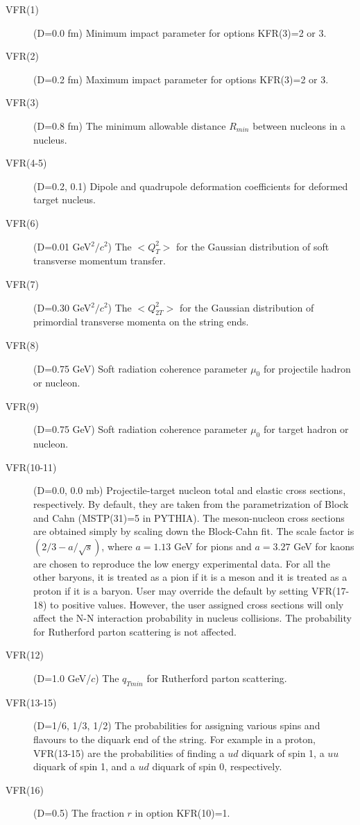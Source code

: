 \begin{itemize}
\begin{description}
\item[VFR(1)] (D=0.0 fm)
       Minimum impact parameter for options KFR(3)=2 or 3.
\item[VFR(2)] (D=0.2 fm)
       Maximum impact parameter for options KFR(3)=2 or 3.
\item[VFR(3)] (D=0.8 fm)
       The minimum allowable distance $R_{min}$ between nucleons in a nucleus.  
\item[VFR(4-5)] (D=0.2, 0.1)
       Dipole and quadrupole deformation coefficients for deformed target
       nucleus.
\item[VFR(6)] (D=0.01 GeV$^2/c^2$)
       The $<Q_T^2>$ for the Gaussian distribution of soft transverse 
       momentum transfer.
\item[VFR(7)] (D=0.30 GeV$^2/c^2$)
       The $<Q^2_{2T}>$ for the Gaussian distribution of primordial transverse
       momenta on the string ends.       
\item[VFR(8)] (D=0.75 GeV)
       Soft radiation coherence parameter $\mu_0$ for projectile hadron or
       nucleon. 
\item[VFR(9)] (D=0.75 GeV)
       Soft radiation coherence parameter $\mu_0$ for target hadron or nucleon. 
\item[VFR(10-11)] (D=0.0, 0.0 mb)
       Projectile-target nucleon total and elastic cross 
       sections, respectively.
       By default, they are taken from the parametrization 
       of Block and Cahn \cite{block} (MSTP(31)=5 in PYTHIA).  
       The meson-nucleon cross sections are obtained
       simply by scaling down the Block-Cahn fit. The scale factor is
       $(2/3-a/\sqrt s)$, where $a=1.13$ GeV for pions and $a=3.27$ GeV for kaons
       are chosen to reproduce the low energy experimental data. For
       all the other baryons, it is treated as a pion if it is a meson
       and it is treated as a proton if it is a baryon.
       User may override the default by setting VFR(17-18) to positive values.
       However, the user assigned cross sections will only affect the
       N-N interaction probability in nucleus collisions. The
       probability for Rutherford parton scattering is not affected.  
\item[VFR(12)] (D=1.0 GeV/$c$)
       The $q_{Tmin}$ for Rutherford parton scattering.  
\item[VFR(13-15)] (D=1/6, 1/3, 1/2)
       The probabilities for assigning various spins and flavours to the diquark
       end of the string.  For example in a proton, VFR(13-15) are the
       probabilities of finding a $ud$ diquark of spin 1,
       a $uu$ diquark of spin 1, and a $ud$ diquark of spin 0, respectively. 
\item[VFR(16)] (D=0.5)
       The fraction $r$ in option KFR(10)=1. 


\end{description}
\end{itemize}
